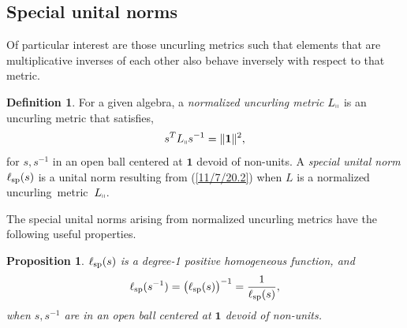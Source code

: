 \documentclass{amsart}
\newtheorem{proposition}[theorem]{Proposition}
\theoremstyle{definition}
\newtheorem{definition}[theorem]{Definition}
\numberwithin{theorem}{section}
\numberwithin{equation}{section}
\begin{document}
\subsection{Special unital norms}
Of particular interest are those uncurling metrics such that elements that are multiplicative inverses of each other also behave inversely with respect to that metric.   
 
 \enlargethispage{.5cm}
    \begin{definition}\label{9/20/23.1} For a given algebra, a {\it normalized uncurling metric} $L_{\shortparallel}$ is an uncurling metric that satisfies, \begin{equation} \label{7/7/21.1} s^TL_{\shortparallel} s^{-1} =\|{\bf 1}\|^2,\end{equation} for $s,s^{-1}$ in an open ball centered at $\mathbf{1}$ devoid of non-units.   A {\it special unital norm} $\ell_{\rm sp}(s)$ is a unital norm resulting from (\ref{11/7/20.2}) when $L$ is a normalized \mbox{uncurling metric $L_{\shortparallel}$}. 
\end{definition}

The special unital norms arising from normalized uncurling metrics have the following useful properties.
  
  \begin{proposition}\label{9/24/23.1} $ \ell_{\rm sp}(s)$ is a degree-1 positive homogeneous function, and
\begin{equation}\label{5/23/23.3}  \ell_{\rm sp}(s^{-1}) = \big(\ell_{\rm sp}(s)\big)^{-1} = \frac{1}{\ell_{\rm sp}(s)}, \end{equation} when $s,s^{-1}$ are in an open ball centered at $\mathbf{1}$ devoid of non-units. \end{proposition}
\end{document}
